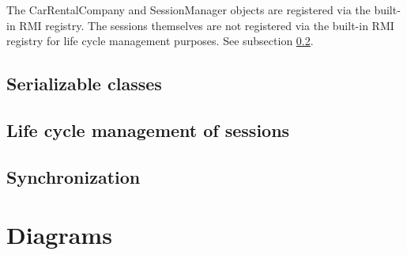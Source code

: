 \documentclass[10pt,a4paper]{report}
\begin{document}
The CarRentalCompany and SessionManager objects are registered via the built-in RMI registry. The sessions themselves are not registered via the built-in RMI registry for life cycle management purposes. See subsection \ref{lifecycle}.

\subsection{Serializable classes}

\subsection{Life cycle management of sessions}
\label{lifecycle}

\subsection{Synchronization}

\section{Diagrams}
\end{document}

